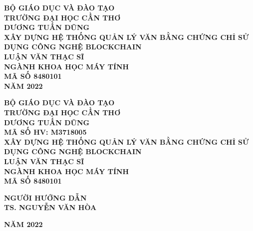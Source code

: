 \begin{titlepage}
        \parindent0pt

        \pagestyle{empty}

        \begin{center}
                \textbf{\large \textsc{BỘ GIÁO DỤC VÀ ĐÀO TẠO \\TRƯỜNG ĐẠI HỌC CẦN THƠ}}
                \vspace{30mm}
                \\
                \textbf{\large DƯƠNG TUẤN DŨNG}
                \vspace{35mm}
                \\
                \textbf{\huge XÂY DỰNG HỆ THỐNG QUẢN LÝ VĂN BẰNG CHỨNG CHỈ SỬ DỤNG CÔNG NGHỆ BLOCKCHAIN}
                \vspace{45mm}
                \\
                \textbf{\large LUẬN VĂN THẠC SĨ \\ NGÀNH KHOA HỌC MÁY TÍNH  \\ MÃ SỐ 8480101}
                \vspace{60mm}
                \\
                \textbf {\large NĂM 2022}
        \end{center}

        \clearpage
        \begin{center}
                \textbf{\large \textsc{BỘ GIÁO DỤC VÀ ĐÀO TẠO \\TRƯỜNG ĐẠI HỌC CẦN THƠ}}
                \vspace{30mm}
                \\
                \textbf{\large DƯƠNG TUẤN DŨNG}
                \\
                \textbf{\large{MÃ SỐ HV: M3718005}}
                \vspace{35mm}
                \\
                \textbf{\huge XÂY DỰNG HỆ THỐNG QUẢN LÝ VĂN BẰNG CHỨNG CHỈ SỬ DỤNG CÔNG NGHỆ BLOCKCHAIN}
                \vspace{45mm}
                \\
                \textbf{\large LUẬN VĂN THẠC SĨ \\ NGÀNH KHOA HỌC MÁY TÍNH  \\ MÃ SỐ 8480101}
                \\
		\vspace{20mm}
		
                \textbf{\large{NGƯỜI HƯỚNG DẪN} }
		\\
		\textbf{\large{TS. NGUYỄN VĂN HÒA} }
		\\
		\vspace{30mm}
                
                \textbf {\large NĂM 2022}
        \end{center}
\end{titlepage}